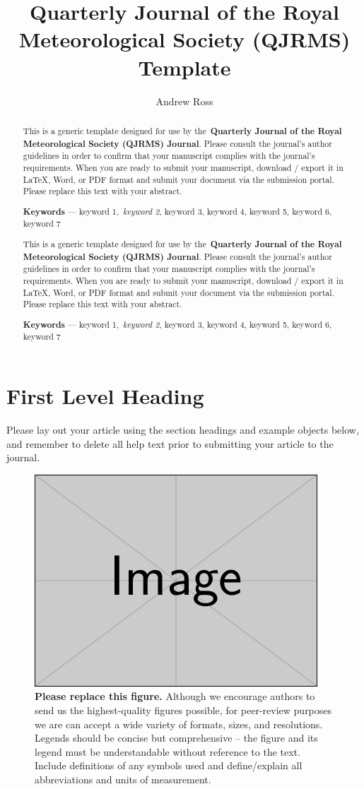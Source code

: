 \documentclass[alpha-refs]{wiley-article}
\title{Quarterly Journal of the Royal Meteorological Society (QJRMS) Template}
\author[1]{Andrew Ross}
\affil[1]{University of Leeds}
\newcommand\linenoyes{}
\newcommand\myabstract[1]{
\ifdefined\linenoyes
\begin{internallinenumbers}[1]
#1
\end{internallinenumbers}
\fi
\unless\ifdefined\linenoyes
#1
\fi
}
\begin{document}
\maketitle
{}
\begin{abstract}

\myabstract{
This is a generic template designed for use by the~\textbf{Quarterly
Journal of the Royal Meteorological Society (QJRMS) Journal}. Please
consult the journal's author guidelines in order to confirm that your
manuscript complies with the journal's requirements. When you are ready
to submit your manuscript, download / export it in LaTeX, Word, or PDF
format and submit your document via the submission portal. Please
replace this text with your abstract.

\textbf{Keywords} --- keyword 1,~\emph{keyword 2}, keyword 3, keyword 4,
keyword 5, keyword 6, keyword 7%
}

\end{abstract}%


\ifdefined\linenoyes
\linenumbers
\fi

\section{First Level Heading}

{\label{707961}}

Please lay out your article using the section headings and example
objects below, and remember to delete all help text prior to submitting
your article to the journal.
\begin{figure}[h!]
\begin{center}
\includegraphics[width=0.70\columnwidth]{figures/example-image-rectangle/example-image-rectangle}
\caption{{\textbf{Please replace this figure.} Although we encourage authors to
send us the highest-quality figures possible, for peer-review purposes
we are can accept a wide variety of formats, sizes, and resolutions.
Legends should be concise but comprehensive -- the figure and its legend
must be understandable without reference to the text. Include
definitions of any symbols used and define/explain all abbreviations and
units of measurement.
{\label{div-126281}}%
}}
\end{center}
\end{figure}
\end{document}
